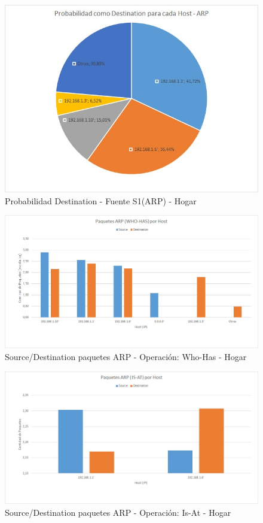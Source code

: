 \begin{figure}[h!]
\centering
\includegraphics[width=\textwidth]{./img/proba_dst_casa.jpg}
\caption{Probabilidad Destination - Fuente S1(ARP) - Hogar}
\end{figure}
\newpage

\begin{figure}[h!]
\centering
\includegraphics[width=\textwidth]{./img/arp_whoHas_casa.jpg}
\caption{Source/Destination paquetes ARP - Operación: Who-Has - Hogar}
\end{figure}

\begin{figure}[h!]
\centering
\includegraphics[width=\textwidth]{./img/arp_isAt_casa.jpg}
\caption{Source/Destination paquetes ARP - Operación: Is-At - Hogar}
\end{figure}
